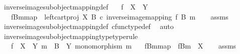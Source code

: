 \begin{isabellebody}
\isanewline
{}\isamarkupfalse%
\ inverse{\isacharunderscore}{\kern0pt}image{\isacharunderscore}{\kern0pt}subobject{\isacharunderscore}{\kern0pt}mapping{\isacharunderscore}{\kern0pt}def{}{\isacharcolon}{\kern0pt}\isanewline
\ \ \ {\isachardoublequoteopen}f\ {\isacharcolon}{\kern0pt}\ X\ {\isasymrightarrow}\ Y{\isachardoublequoteclose}\isanewline
\ \ \ {\isachardoublequoteopen}{\isacharbrackleft}{\kern0pt}f\isactrlsup {\isacharminus}{\kern0pt}B{\isasymrparr}\isactrlbsub m\isactrlesub {\isacharbrackright}{\kern0pt}map\ {\isacharequal}{\kern0pt}\ left{\isacharunderscore}{\kern0pt}cart{\isacharunderscore}{\kern0pt}proj\ X\ B\ {\isasymcirc}\isactrlsub c\ inverse{\isacharunderscore}{\kern0pt}image{\isacharunderscore}{\kern0pt}mapping\ f\ B\ m{\isachardoublequoteclose}\isanewline
%
\isadelimproof
\ \ %
\endisadelimproof
%
\isatagproof
{}\isamarkupfalse%
\ assms\ \isamarkupfalse%
\ inverse{\isacharunderscore}{\kern0pt}image{\isacharunderscore}{\kern0pt}subobject{\isacharunderscore}{\kern0pt}mapping{\isacharunderscore}{\kern0pt}def\ cfunc{\isacharunderscore}{\kern0pt}type{\isacharunderscore}{\kern0pt}def\ \isamarkupfalse%
\ auto%
\endisatagproof
{\isafoldproof}%
%
\isadelimproof
\isanewline
%
\endisadelimproof
\isanewline
{}\isamarkupfalse%
\ inverse{\isacharunderscore}{\kern0pt}image{\isacharunderscore}{\kern0pt}subobject{\isacharunderscore}{\kern0pt}mapping{\isacharunderscore}{\kern0pt}type{\isacharbrackleft}{\kern0pt}type{\isacharunderscore}{\kern0pt}rule{\isacharbrackright}{\kern0pt}{\isacharcolon}{\kern0pt}\isanewline
\ \ \ {\isachardoublequoteopen}f\ {\isacharcolon}{\kern0pt}\ X\ {\isasymrightarrow}\ Y{\isachardoublequoteclose}\ {\isachardoublequoteopen}m\ {\isacharcolon}{\kern0pt}\ B\ {\isasymrightarrow}\ Y{\isachardoublequoteclose}\ {\isachardoublequoteopen}monomorphism\ m{\isachardoublequoteclose}\isanewline
\ \ \ {\isachardoublequoteopen}{\isacharbrackleft}{\kern0pt}f\isactrlsup {\isacharminus}{\kern0pt}B{\isasymrparr}\isactrlbsub m\isactrlesub {\isacharbrackright}{\kern0pt}map\ {\isacharcolon}{\kern0pt}\ f\isactrlsup {\isacharminus}{\kern0pt}B{\isasymrparr}\isactrlbsub m\isactrlesub \ {\isasymrightarrow}\ X{\isachardoublequoteclose}\isanewline
%
\isadelimproof
\ \ %
\endisadelimproof
%
\isatagproof
{}\isamarkupfalse%
\ assms\ \isamarkupfalse%

\end{isabellebody}
